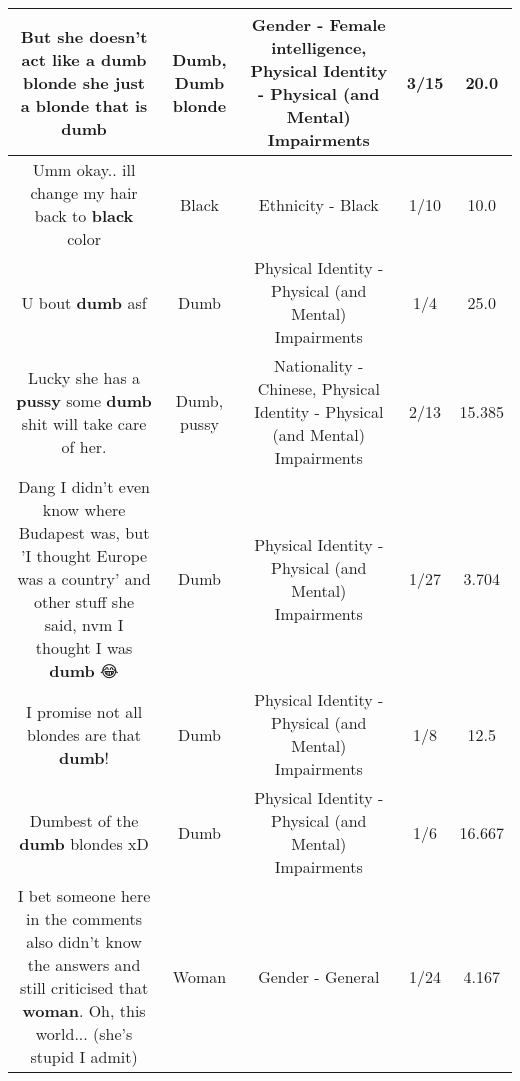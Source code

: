\documentclass[11pt]{article}
\newlength\mylength
\begin{document}
\begin{center}
\begin{longtable}{|C{.65\mylength}|C{.30\mylength}|C{.12\mylength}|C{.12\mylength}|C{.12\mylength}|}
  \small But she doesn't act like a \textbf{d\textbf{umb} blonde} she just a blonde that is dumb\normalsize   & Dumb, Dumb blonde & Gender - Female intelligence, Physical Identity - Physical (and Mental) Impairments & 3/15 & 20.0 \\  \hline
  \small Umm okay.. ill change my hair back to \textbf{black} color\normalsize   & Black & Ethnicity - Black & 1/10 & 10.0 \\  \hline
  \small U bout \textbf{dumb} asf\normalsize   & Dumb & Physical Identity - Physical (and Mental) Impairments & 1/4 & 25.0 \\  \hline
  \small Lucky she has a \textbf{pussy} some \textbf{dumb} shit will take care of her.\normalsize   & Dumb, pussy & Nationality - Chinese, Physical Identity - Physical (and Mental) Impairments & 2/13 & 15.385 \\  \hline
  \small Dang I didn't even know where Budapest was, but 'I thought Europe was a country' and other stuff she said, nvm I thought I was \textbf{dumb} 😂\normalsize   & Dumb & Physical Identity - Physical (and Mental) Impairments & 1/27 & 3.704 \\  \hline
  \small I promise not all blondes are that \textbf{dumb}!\normalsize   & Dumb & Physical Identity - Physical (and Mental) Impairments & 1/8 & 12.5 \\  \hline
  \small Dumbest of the \textbf{dumb} blondes xD\normalsize   & Dumb & Physical Identity - Physical (and Mental) Impairments & 1/6 & 16.667 \\  \hline
  \small I bet someone here in the comments also didn't know the answers and still criticised that \textbf{woman}. Oh, this world... (she's stupid I admit)\normalsize   & Woman & Gender - General & 1/24 & 4.167 \\  \hline

\end{longtable}
\end{center}
\end{document}
